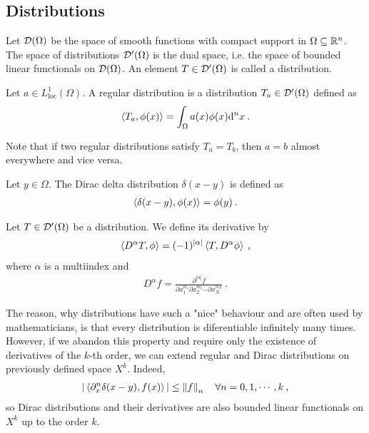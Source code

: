 \subsection{Distributions}

\begin{definition}[Distributions]
    Let $\mathcal{D}(\Omega)$ be the space of smooth functions with compact support in $\Omega \subseteq \mathbb{R}^n$. The space of distributions $\mathcal{D'}(\Omega)$ is the dual space, i.e. the space of bounded linear functionals on $\mathcal{D}(\Omega)$. An element $T \in \mathcal{D'}(\Omega)$ is called a distribution.
\end{definition}

\begin{definition}
    Let $a \in L^1_{\text{loc}}(\Omega)$. A regular distribution is a distribution $T_a \in \mathcal{D'}(\Omega)$ defined as
    \begin{align}
        \left \langle T_a ,\phi(x) \right \rangle = \int_\Omega a(x) \phi(x) \mathrm{d}^n x \:.
    \end{align}
\end{definition}

Note that if two regular distributions satisfy $T_a = T_b$, then $a=b$ almost everywhere and vice versa.

\begin{definition}
    Let $y \in \Omega$. The Dirac delta distribution $\delta(x-y)$ is defined as
    \begin{align}
        \left \langle \delta(x-y) ,\phi(x) \right \rangle = \phi(y) \:. 
    \end{align}
\end{definition}

\begin{definition}
    Let $T \in \mathcal{D'}(\Omega)$ be a distribution. We define its derivative by
    \begin{align}
        \left \langle D^\alpha T ,\phi \right \rangle = (-1)^{|\alpha|} \left \langle T ,D^\alpha \phi \right \rangle \:,
    \end{align}
    where $\alpha$ is a multiindex and
    \begin{align}
        D^\alpha f = \frac{\partial^{|\alpha|} f}{\partial x_1^{\alpha_1} \partial x_2^{\alpha_2} \cdots \partial x^{\alpha_N}_N} \:.
    \end{align}
\end{definition}

The reason, why distributions have such a "nice" behaviour and are often used by mathematicians, is that every distribution is diferentiable infinitely many times. However, if we abandon this property and require only the existence of derivatives of the $k$-th order, we can extend regular and Dirac distributions on previously defined space $X^k$. Indeed,
\begin{align}
    | \left \langle \partial_x^n \delta(x-y) ,f(x) \right \rangle | \leq \left \Vert f \right \Vert_n \quad \forall n = 0,1,\cdots, k\:,
\end{align}
so Dirac distributions and their derivatives are also bounded linear functionals on $X^k$ up to the order $k$.

